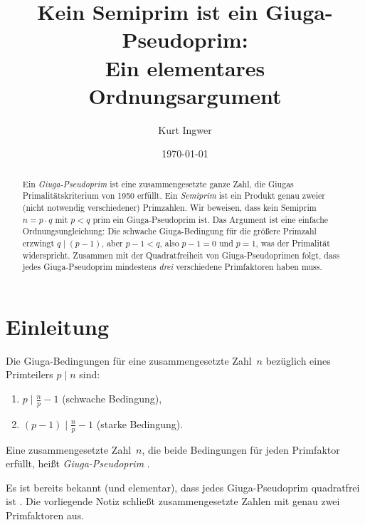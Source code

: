 \documentclass[12pt,a4paper]{amsart}
\theoremstyle{definition}
\begin{document}

\title{Kein Semiprim ist ein Giuga-Pseudoprim:\\ Ein elementares Ordnungsargument}

\author{Kurt Ingwer}
\address{Specialist Mathematics Project, Version Build 44}
\date{\today}

\begin{abstract}
Ein \emph{Giuga-Pseudoprim} ist eine zusammengesetzte ganze Zahl, die Giugas
Primalitätskriterium von 1950 erfüllt. Ein \emph{Semiprim} ist ein Produkt genau zweier
(nicht notwendig verschiedener) Primzahlen. Wir beweisen, dass kein Semiprim
$n = p \cdot q$ mit $p < q$ prim ein Giuga-Pseudoprim ist. Das Argument ist eine
einfache Ordnungsungleichung: Die schwache Giuga-Bedingung für die größere Primzahl
erzwingt $q \mid (p-1)$, aber $p - 1 < q$, also $p - 1 = 0$ und $p = 1$, was der
Primalität widerspricht. Zusammen mit der Quadratfreiheit von Giuga-Pseudoprimen folgt,
dass jedes Giuga-Pseudoprim mindestens \emph{drei} verschiedene Primfaktoren haben muss.
\end{abstract}

\maketitle

\section{Einleitung}

Die Giuga-Bedingungen für eine zusammengesetzte Zahl~$n$ bezüglich eines Primteilers
$p \mid n$ sind:
\begin{enumerate}
  \item[\textup{(S)}] $p \mid \tfrac{n}{p} - 1$ \quad (schwache Bedingung),
  \item[\textup{(St)}] $(p-1) \mid \tfrac{n}{p} - 1$ \quad (starke Bedingung).
\end{enumerate}
Eine zusammengesetzte Zahl~$n$, die beide Bedingungen für jeden Primfaktor erfüllt,
heißt \emph{Giuga-Pseudoprim} \cite{Borwein1996}.

Es ist bereits bekannt (und elementar), dass jedes Giuga-Pseudoprim quadratfrei ist
\cite{Ingwer2026qfrei}. Die vorliegende Notiz schließt zusammengesetzte Zahlen mit genau
zwei Primfaktoren aus.
\end{document}
